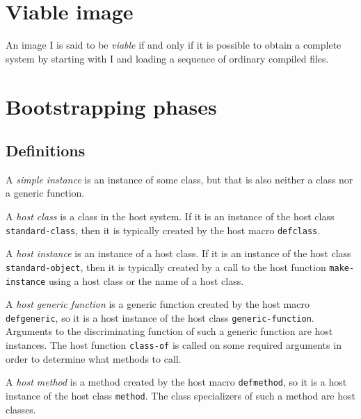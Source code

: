 \section{Viable image}
\label{sec-bootstrapping-viable-image}

An image I is said to be \emph{viable} if and only if it is possible
to obtain a complete \commonlisp{} system by starting with I and loading a
sequence of ordinary compiled files.

\section{Bootstrapping phases}

\subsection{Definitions}

\begin{definition}
A \emph{simple instance} is an instance of some class, but that is
also neither a class nor a generic function.
\end{definition}

\begin{definition}
A \emph{host class} is a class in the host system.  If it is an
instance of the host class \texttt{standard-class}, then it is
typically created by the host macro \texttt{defclass}.
\end{definition}

\begin{definition}
A \emph{host instance} is an instance of a host class.  If it is an
instance of the host class \texttt{standard-object}, then it is
typically created by a call to the host function
\texttt{make-instance} using a host class or the name of a host class.
\end{definition}

\begin{definition}
A \emph{host generic function} is a generic function created by the
host macro \texttt{defgeneric}, so it is a host instance of the host
class \texttt{generic-function}.  Arguments to the discriminating
function of such a generic function are host instances.  The host
function \texttt{class-of} is called on some required arguments in
order to determine what methods to call.
\end{definition}

\begin{definition}
A \emph{host method} is a method created by the host macro
\texttt{defmethod}, so it is a host instance of the host class
\texttt{method}.  The class specializers of such a method are host
classes.
\end{definition}


